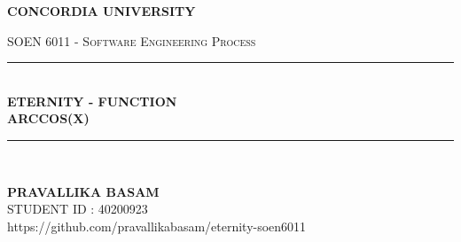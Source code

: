 \documentclass{article}
\begin{document}
    \begin{titlepage}
        \centering
        \vspace*{0.5 cm}
        \begin{center}    \textsc{\huge \textbf{CONCORDIA UNIVERSITY}}\\[1.0 cm]	\end{center}
        \textsc{\Large  SOEN 6011 - Software Engineering Process }\\[1.0 cm]
        \rule{\linewidth}{0.2 mm} \\[1.0 cm]
        { \huge \textbf {ETERNITY - FUNCTION}}\\[0.2 cm]
        { \huge \textbf{ARCCOS(X)}}\\[1.0 cm]
        \rule{\linewidth}{0.2 mm} \\[1.0 cm]
        \begin{center}   {\Large \textbf{PRAVALLIKA BASAM}} \\[0.5 cm]
        {\large STUDENT ID : 40200923 }\\[0.5 cm]
        \vspace*{0.5 cm}
        {\large https://github.com/pravallikabasam/eternity-soen6011}
        \end{center}
    \end{titlepage}
\end{document}
